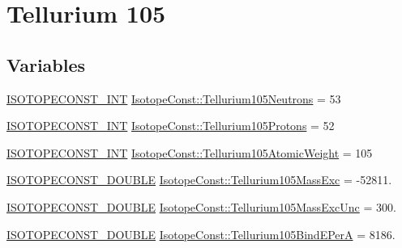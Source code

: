 \hypertarget{group___isotope_const-_tellurium-_te105}{}\section{Tellurium 105}
\label{group___isotope_const-_tellurium-_te105}
\subsection*{Variables}
\begin{DoxyCompactItemize}
\item 
\mbox{\hyperlink{group___isotope_const-_macros_ga5f18360b3e99483a35c32d789e62621c}{I\+S\+O\+T\+O\+P\+E\+C\+O\+N\+S\+T\+\_\+\+I\+NT}} \mbox{\hyperlink{group___isotope_const-_tellurium-_te105_ga56ee41b5ebe9d71a16418ff49b716eec}{Isotope\+Const\+::\+Tellurium105\+Neutrons}} = 53
\item 
\mbox{\hyperlink{group___isotope_const-_macros_ga5f18360b3e99483a35c32d789e62621c}{I\+S\+O\+T\+O\+P\+E\+C\+O\+N\+S\+T\+\_\+\+I\+NT}} \mbox{\hyperlink{group___isotope_const-_tellurium-_te105_ga616f9ddc6b305c972e556a6557a552e6}{Isotope\+Const\+::\+Tellurium105\+Protons}} = 52
\item 
\mbox{\hyperlink{group___isotope_const-_macros_ga5f18360b3e99483a35c32d789e62621c}{I\+S\+O\+T\+O\+P\+E\+C\+O\+N\+S\+T\+\_\+\+I\+NT}} \mbox{\hyperlink{group___isotope_const-_tellurium-_te105_ga41f887e29a1480e252245d287bc1fd91}{Isotope\+Const\+::\+Tellurium105\+Atomic\+Weight}} = 105
\item 
\mbox{\hyperlink{group___isotope_const-_macros_ga8f45a7272ce02c0b4c65c44636ed719a}{I\+S\+O\+T\+O\+P\+E\+C\+O\+N\+S\+T\+\_\+\+D\+O\+U\+B\+LE}} \mbox{\hyperlink{group___isotope_const-_tellurium-_te105_ga055d5c6737c6796051f71b032893804a}{Isotope\+Const\+::\+Tellurium105\+Mass\+Exc}} = -\/52811.
\item 
\mbox{\hyperlink{group___isotope_const-_macros_ga8f45a7272ce02c0b4c65c44636ed719a}{I\+S\+O\+T\+O\+P\+E\+C\+O\+N\+S\+T\+\_\+\+D\+O\+U\+B\+LE}} \mbox{\hyperlink{group___isotope_const-_tellurium-_te105_gac85792825ca3576f8b73c4bef86a2186}{Isotope\+Const\+::\+Tellurium105\+Mass\+Exc\+Unc}} = 300.
\item 
\mbox{\hyperlink{group___isotope_const-_macros_ga8f45a7272ce02c0b4c65c44636ed719a}{I\+S\+O\+T\+O\+P\+E\+C\+O\+N\+S\+T\+\_\+\+D\+O\+U\+B\+LE}} \mbox{\hyperlink{group___isotope_const-_tellurium-_te105_ga7ab7805344e294a834bea999c8c9df5b}{Isotope\+Const\+::\+Tellurium105\+Bind\+E\+PerA}} = 8186.
\item 

\end{DoxyCompactItemize}
